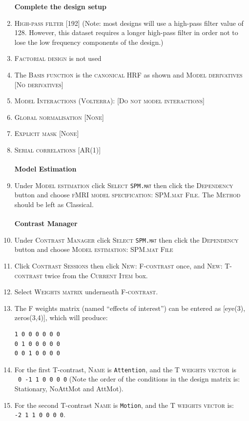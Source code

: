 \begin{enumerate}
\textbf{Complete the design setup}
\item \textsc{High-pass filter} [192] (Note: most designs will use a high-pass filter value of 128. However, this dataset requires a longer high-pass filter in order not to lose the low frequency components of the design.)
\item \textsc{Factorial design} is not used
\item The \textsc{Basis function} is the \textsc{canonical HRF} as shown and \textsc{Model derivatives} [\textsc{No derivatives}]
\item \textsc{Model Interactions (Volterra)}: [\textsc{Do not model interactions}]
\item \textsc{Global normalisation} [\textsc{None}]
\item \textsc{Explicit mask} [\textsc{None}]
\item \textsc{Serial correlations} [\textsc{AR(1)}]\\\\

\textbf{Model Estimation}
\item Under \textsc{Model estimation} click \textsc{Select \texttt{SPM.mat}} then click the \textsc{Dependency} button and choose \textsc{fMRI model specification: SPM.mat File}. The \textsc{Method} should be left as Classical.\\\\

\textbf{Contrast Manager}
\item Under \textsc{Contrast Manager} click \textsc{Select \texttt{SPM.mat}} then click the \textsc{Dependency} button and choose \textsc{Model estimation: SPM.mat File}

\item Click \textsc{Contrast Sessions} then click \textsc{New: F-contrast} once, and \textsc{New: T-contrast} twice from the \textsc{Current Item} box.
\item Select \textsc{Weights matrix} underneath \textsc{F-contrast}. 
\item The F weights matrix (named ``effects of interest'') can be entered as [eye(3), zeros(3,4)], which will produce:
\begin{verbatim}
1 0 0 0 0 0 0
0 1 0 0 0 0 0
0 0 1 0 0 0 0
\end{verbatim}

\item For the first T-contrast, \textsc{Name} is \texttt{Attention}, and the \textsc{T weights vector} is \texttt{~0~-1~1~0~0~0~0} (Note the order of the conditions in the design matrix is: Stationary, NoAttMot and AttMot).
\item For the second T-contrast \textsc{Name} is \texttt{Motion}, and the \textsc{T weights vector} is: \texttt{-2~1~1~0~0~0~0}.


\end{enumerate}
